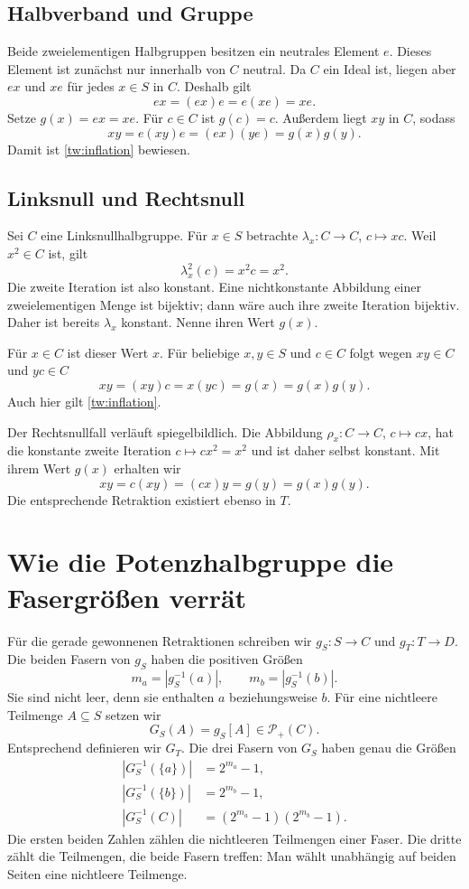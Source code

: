 \documentclass[a4paper,11pt]{article}
\newcommand{\Pp}[1]{\mathcal P_+(#1)}
\begin{document}
\subsection{Halbverband und Gruppe}

Beide zweielementigen Halbgruppen besitzen ein neutrales Element
\(e\). Dieses Element ist zunächst nur innerhalb von \(C\) neutral.
Da \(C\) ein Ideal ist, liegen aber \(ex\) und \(xe\) für jedes
\(x\in S\) in \(C\). Deshalb gilt
\[
 ex=(ex)e=e(xe)=xe.
\]
Setze \(g(x)=ex=xe\). Für \(c\in C\) ist \(g(c)=c\).
Außerdem liegt \(xy\) in \(C\), sodass
\[
 xy=e(xy)e=(ex)(ye)=g(x)g(y).
\]
Damit ist \eqref{tw:inflation} bewiesen.

\subsection{Linksnull und Rechtsnull}

Sei \(C\) eine Linksnullhalbgruppe. Für \(x\in S\) betrachte
\(\lambda_x:C\to C\), \(c\mapsto xc\). Weil \(x^2\in C\)
ist, gilt
\[
 \lambda_x^2(c)=x^2c=x^2.
\]
Die zweite Iteration ist also konstant. Eine nichtkonstante Abbildung
einer zweielementigen Menge ist bijektiv; dann wäre auch ihre zweite
Iteration bijektiv. Daher ist bereits \(\lambda_x\) konstant.
Nenne ihren Wert \(g(x)\).

Für \(x\in C\) ist dieser Wert \(x\). Für beliebige \(x,y\in S\)
und \(c\in C\) folgt wegen \(xy\in C\) und \(yc\in C\)
\[
 xy=(xy)c=x(yc)=g(x)=g(x)g(y).
\]
Auch hier gilt \eqref{tw:inflation}.

Der Rechtsnullfall verläuft spiegelbildlich. Die Abbildung
\(\rho_x:C\to C\), \(c\mapsto cx\), hat die konstante zweite
Iteration \(c\mapsto cx^2=x^2\) und ist daher selbst konstant.
Mit ihrem Wert \(g(x)\) erhalten wir
\[
 xy=c(xy)=(cx)y=g(y)=g(x)g(y).
\]
Die entsprechende Retraktion existiert ebenso in \(T\).

\section{Wie die Potenzhalbgruppe die Fasergrößen verrät}

Für die gerade gewonnenen Retraktionen schreiben wir \(g_S:S\to C\)
und \(g_T:T\to D\). Die beiden Fasern von \(g_S\) haben die
positiven Größen
\[
 m_a=|g_S^{-1}(a)|,\qquad m_b=|g_S^{-1}(b)|.
\]
Sie sind nicht leer, denn sie enthalten \(a\) beziehungsweise \(b\).
Für eine nichtleere Teilmenge \(A\subseteq S\) setzen wir
\[
 G_S(A)=g_S[A]\in\Pp C.
\]
Entsprechend definieren wir \(G_T\). Die drei Fasern von \(G_S\)
haben genau die Größen
\begin{equation}\label{tw:fibres}
 \begin{aligned}
 |G_S^{-1}(\{a\})|&=2^{m_a}-1,\\
 |G_S^{-1}(\{b\})|&=2^{m_b}-1,\\
 |G_S^{-1}(C)|&=(2^{m_a}-1)(2^{m_b}-1).
 \end{aligned}
\end{equation}
Die ersten beiden Zahlen zählen die nichtleeren Teilmengen einer Faser.
Die dritte zählt die Teilmengen, die beide Fasern treffen: Man wählt
unabhängig auf beiden Seiten eine nichtleere Teilmenge.
\end{document}
